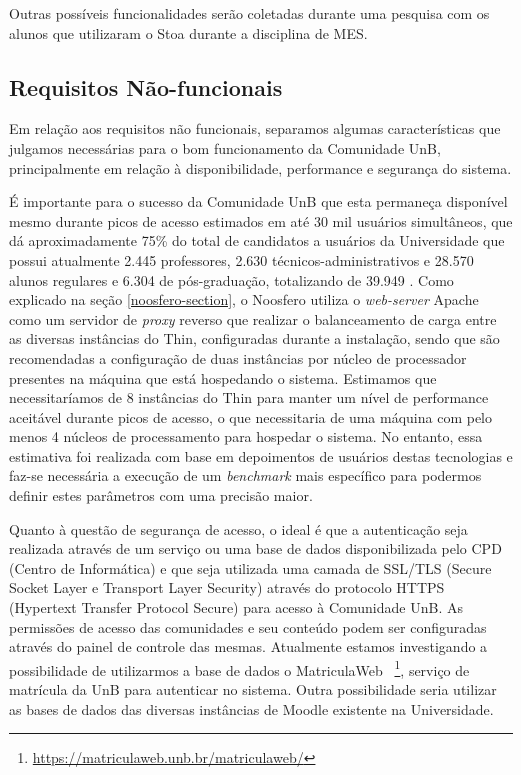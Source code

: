 Outras possíveis funcionalidades serão coletadas durante uma pesquisa com os
alunos que utilizaram o Stoa durante a disciplina de MES.

\subsection{Requisitos Não-funcionais}

Em relação aos requisitos não funcionais, separamos algumas características que
julgamos necessárias para o bom funcionamento da Comunidade UnB, principalmente
em relação à disponibilidade, performance e segurança do sistema.

É importante para o sucesso da Comunidade UnB que esta permaneça disponível
mesmo durante picos de acesso estimados em até 30 mil usuários simultâneos,
que dá aproximadamente 75\% do total de candidatos a usuários da Universidade
que possui atualmente 2.445 professores, 2.630 técnicos-administrativos
e 28.570 alunos regulares e 6.304 de pós-graduação, totalizando de 39.949
\cite{unbInstituicao}. Como explicado na seção \ref{noosfero-section}, o Noosfero
utiliza o \textit{web-server} Apache como um servidor de \textit{proxy} reverso
que realizar o balanceamento de carga entre as diversas instâncias do Thin,
configuradas durante a instalação, sendo que são recomendadas a configuração de
duas instâncias por núcleo de processador presentes na máquina que está
hospedando o sistema.
%
Estimamos que necessitaríamos de 8 instâncias do Thin
para manter um nível de performance aceitável durante picos de acesso, o que
necessitaria de uma máquina com pelo menos 4 núcleos de processamento para
hospedar o sistema. No entanto, essa estimativa foi realizada com base em
depoimentos de usuários destas tecnologias e faz-se necessária a execução de
um \textit{benchmark} mais específico para podermos definir estes parâmetros com
uma precisão maior.

Quanto à questão de segurança de acesso, o ideal é que a autenticação seja
realizada através de um serviço ou uma base de dados disponibilizada pelo CPD
(Centro de Informática) e que seja utilizada uma camada de SSL/TLS (Secure Socket
Layer e Transport Layer Security) através do protocolo HTTPS (Hypertext Transfer
Protocol Secure) para acesso à Comunidade UnB. As permissões de acesso das
comunidades e seu conteúdo podem ser configuradas através do painel de controle
das mesmas. Atualmente estamos investigando a possibilidade de utilizarmos a
base de dados o MatriculaWeb
~\footnote{\url{https://matriculaweb.unb.br/matriculaweb/}}, serviço de matrícula
da UnB para autenticar no sistema. Outra possibilidade seria utilizar as bases
de dados das diversas instâncias de Moodle existente na Universidade.
	

